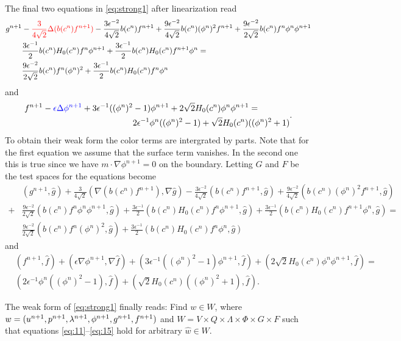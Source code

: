 The final two equations in \eqref{eq:strong1} after linearization read
\[
\begin{split}
g^{n+1}&-\textcolor{red}{\frac{3}{4\sqrt{2}}\Delta(b(c^n) f^{n+1})}-
\frac{3\epsilon^{-2}}{4\sqrt{2}}b(c^n) f^{n+1}+
\frac{9\epsilon^{-2}}{4\sqrt{2}}b(c^n) (\phi^n)^2 f^{n+1}+
\frac{9\epsilon^{-2}}{2\sqrt{2}}b(c^n) f^n \phi^n \phi^{n+1}\\
%
&\frac{3\epsilon^{-1}}{2}b(c^n)H_0(c^n)f^n \phi^{n+1}+
 \frac{3\epsilon^{-1}}{2}b(c^n)H_0(c^n)f^{n+1} \phi^{n}
 =\\
&\frac{9\epsilon^{-2}}{2\sqrt{2}}b(c^n) f^n (\phi^n)^2 +
 \frac{3\epsilon^{-1}}{2}b(c^n)H_0(c^n) f^{n} \phi^{n}
\end{split}
\]
and
\[%
\begin{split}
f^{n+1}-\textcolor{blue}{\epsilon \Delta \phi^{n+1}}
+3\epsilon^{-1}(
(\phi^n)^2 &-1
)\phi^{n+1}
+2\sqrt{2}H_0(c^n)\phi^n \phi^{n+1}=\\
&2\epsilon^{-1}\phi^n(
(\phi^n)^2-1) +
\sqrt{2}H_0(c^n)(
(\phi^n)^2+1
)
\end{split}.
\]
To obtain their weak form the color terms are intergrated by parts. Note that
for the first equation we assume that the surface term vanishes. In the
second one this is true since we have $m \cdot\nabla \phi^{n+1}=0$ on the boundary.
Letting $G$ and $F$ be the test spaces for the equations become
%
\begin{equation}\label{eq:14}
\begin{split}
&(g^{n+1}, \hat{g})
+\frac{3}{4\sqrt{2}}(\nabla (b(c^n) f^{n+1}), \nabla \hat{g}) -
\frac{3\epsilon^{-2}}{4\sqrt{2}}(b(c^n) f^{n+1}, \hat{g})+
\frac{9\epsilon^{-2}}{4\sqrt{2}}(b(c^n) (\phi^n)^2 f^{n+1}, \hat{g})\\
+&\frac{9\epsilon^{-2}}{2\sqrt{2}}(b(c^n) f^n \phi^n \phi^{n+1}, \hat{g})
%
+
 \frac{3\epsilon^{-1}}{2} (b(c^n)H_0(c^n)f^n \phi^{n+1}, \hat{g})+
 \frac{3\epsilon^{-1}}{2} (b(c^n)H_0(c^n)f^{n+1} \phi^{n}, \hat{g})
 =\\
&\frac{9\epsilon^{-2}}{2\sqrt{2}} (b(c^n) f^n (\phi^n)^2, \hat{g}) +
 \frac{3\epsilon^{-1}}{2} (b(c^n)H_0(c^n) f^{n} \phi^{n}, \hat{g})
\end{split}
\end{equation}
%
and
\begin{equation}\label{eq:15}
\begin{split}
&(f^{n+1}, \hat{f})
+(\epsilon \nabla \phi^{n+1}, \nabla\hat{f})
+(3\epsilon^{-1}((\phi^n)^2 -1)\phi^{n+1}, \hat{f})
+(2\sqrt{2}H_0(c^n)\phi^n \phi^{n+1}, \hat{f})=\\
&(2\epsilon^{-1}\phi^n((\phi^n)^2-1), \hat{f})
+
(\sqrt{2}H_0(c^n)((\phi^n)^2+1), \hat{f}).
\end{split}
\end{equation}

The weak form of \eqref{eq:strong1} finally reads: Find $w\in W$, where
$w=(u^{n+1}, p^{n+1}, \lambda^{n+1}, \phi^{n+1}, g^{n+1}, f^{n+1})$
and $W=V\times Q\times \Lambda \times \Phi \times G \times F$ such that
equations \eqref{eq:11}--\eqref{eq:15} hold for arbitrary $\hat{w}\in W$.
